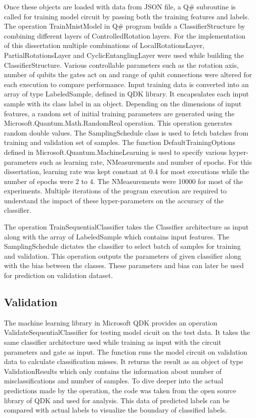 \documentclass[english,a4paper,11pt,oneside,onecolumn]{book}
\begin{document}
Once these objects are loaded with data from JSON file, a Q\# subroutine is called for training model circuit by passing both the training features and labels. The operation TrainMnistModel in Q\# program builds a ClassifierStructure by combining different layers of ControlledRotation layers. For the implementation of this dissertation multiple combinations of LocalRotationsLayer, PartialRotationsLayer and CyclicEntanglingLayer were used while building the ClassifierStructure. Various controllable parameters such as the rotation axis, number of qubits the gates act on and range of qubit connections were altered for each execution to compare performance. Input training data is converted into an array of type LabeledSample, defined in QDK library. It encapsulates each input sample with its class label in an object. Depending on the dimensions of input features, a random set of initial training parameters are generated using the Microsoft.Quantum.Math.RandomReal operation. This operation generates random double values. The SamplingSchedule class is used to fetch batches from training and validation set of samples. The function DefaultTrainingOptions defined in Microsoft.Quantum.MachineLearning is used to specify various hyper-parameters such as learning rate, NMeasurements and number of epochs. For this dissertation, learning rate was kept constant at 0.4 for most executions while the number of epochs were 2 to 4. The NMeasurements were 10000 for most of the experiments. Multiple iterations of the program execution are required to understand the impact of these hyper-parameters on the accuracy of the classifier.

The operation TrainSequentialClassifier takes the Classifier architecture as input along with the array of LabeledSample which contains input features. The SamplingSchedule dictates the classifier to select batch of samples for training and validation. This operation outputs the parameters of given classifier along with the bias between the classes. These parameters and bias can later be used for prediction on validation dataset.

\subsection{Validation}
The machine learning library in Microsoft QDK provides an operation  ValidateSequentialClassifier for testing model cicuit on the test data. It takes the same classifier architecture used while training as input with the circuit parameters and gate as input. The function runs the model circuit on validation data to calculate classification misses. It returns the result as an object of type ValidationResults which only contains the information about number of misclassifications and number of samples. To dive deeper into the actual predictions made by the operation, the code was taken from the open source library of QDK and used for analysis. This data of predicted labels can be compared with actual labels to visualize the boundary of classified labels.
\end{document}
